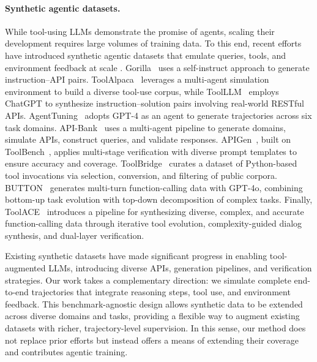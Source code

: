 \paragraph{Synthetic agentic datasets.} While tool-using LLMs demonstrate the promise of agents, scaling their development requires large volumes of training data. To this end, recent efforts have introduced synthetic agentic datasets that emulate queries, tools, and environment feedback at scale \citep{patil2023gorillalargelanguagemodel,tang2023toolalpacageneralizedtoollearning,qin2023toolllmfacilitatinglargelanguage,zeng2023agenttuningenablinggeneralizedagent,xu2025toucan,li-etal-2023-api}. Gorilla~\citep{patil2023gorillalargelanguagemodel} uses a self-instruct approach to generate instruction–API pairs. ToolAlpaca~\citep{tang2023toolalpacageneralizedtoollearning} leverages a multi-agent simulation environment to build a diverse tool-use corpus, while ToolLLM~\citep{qin2023toolllmfacilitatinglargelanguage} employs ChatGPT to synthesize instruction–solution pairs involving real-world RESTful APIs. AgentTuning~\citep{zeng2023agenttuningenablinggeneralizedagent} adopts GPT-4 as an agent to generate trajectories across six task domains. API-Bank~\citep{li2023apibankcomprehensivebenchmarktoolaugmented} uses a multi-agent pipeline to generate domains, simulate APIs, construct queries, and validate responses. APIGen~\citep{liu2024apigenautomatedpipelinegenerating}, built on ToolBench~\citep{qin2023toolllmfacilitatinglargelanguage}, applies multi-stage verification with diverse prompt templates to ensure accuracy and coverage. ToolBridge~\citep{jin2024toolbridgeopensourcedatasetequip} curates a dataset of Python-based tool invocations via selection, conversion, and filtering of public corpora. BUTTON~\citep{chen2025facilitatingmultiturnfunctioncalling} generates multi-turn function-calling data with GPT-4o, combining bottom-up task evolution with top-down decomposition of complex tasks. Finally, ToolACE~\citep{liu2025toolacewinningpointsllm} introduces a pipeline for synthesizing diverse, complex, and accurate function-calling data through iterative tool evolution, complexity-guided dialog synthesis, and dual-layer verification.

Existing synthetic datasets have made significant progress in enabling tool-augmented LLMs, introducing diverse APIs, generation pipelines, and verification strategies. Our work takes a complementary direction: we simulate complete end-to-end trajectories that integrate reasoning steps, tool use, and environment feedback. This benchmark-agnostic design allows synthetic data to be extended across diverse domains and tasks, providing a flexible way to augment existing datasets with richer, trajectory-level supervision. In this sense, our method does not replace prior efforts but instead offers a means of extending their coverage and contributes agentic training.

